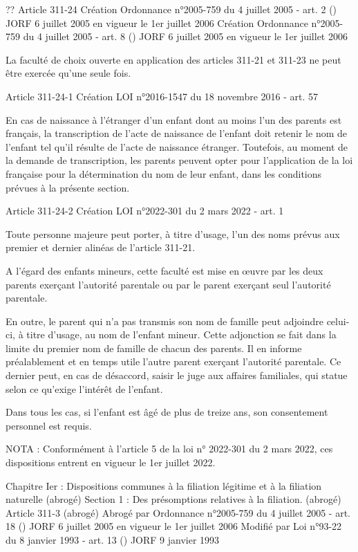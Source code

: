 \documentclass[
  12pt,
]{book}
\begin{document}
\begin{encadre}{??}
Article 311-24
Création Ordonnance n°2005-759 du 4 juillet 2005 - art. 2 () JORF 6 juillet 2005 en vigueur le 1er juillet 2006
Création Ordonnance n°2005-759 du 4 juillet 2005 - art. 8 () JORF 6 juillet 2005 en vigueur le 1er juillet 2006

La faculté de choix ouverte en application des articles 311-21 et 311-23 ne peut être exercée qu'une seule fois.

Article 311-24-1
Création LOI n°2016-1547 du 18 novembre 2016 - art. 57

En cas de naissance à l'étranger d'un enfant dont au moins l'un des parents est français, la transcription de l'acte de naissance de l'enfant doit retenir le nom de l'enfant tel qu'il résulte de l'acte de naissance étranger. Toutefois, au moment de la demande de transcription, les parents peuvent opter pour l'application de la loi française pour la détermination du nom de leur enfant, dans les conditions prévues à la présente section.

Article 311-24-2
Création LOI n°2022-301 du 2 mars 2022 - art. 1

Toute personne majeure peut porter, à titre d'usage, l'un des noms prévus aux premier et dernier alinéas de l'article 311-21.

A l'égard des enfants mineurs, cette faculté est mise en œuvre par les deux parents exerçant l'autorité parentale ou par le parent exerçant seul l'autorité parentale.

En outre, le parent qui n'a pas transmis son nom de famille peut adjoindre celui-ci, à titre d'usage, au nom de l'enfant mineur. Cette adjonction se fait dans la limite du premier nom de famille de chacun des parents. Il en informe préalablement et en temps utile l'autre parent exerçant l'autorité parentale. Ce dernier peut, en cas de désaccord, saisir le juge aux affaires familiales, qui statue selon ce qu'exige l'intérêt de l'enfant.

Dans tous les cas, si l'enfant est âgé de plus de treize ans, son consentement personnel est requis.

NOTA :
Conformément à l'article 5 de la loi n° 2022-301 du 2 mars 2022, ces dispositions entrent en vigueur le 1er juillet 2022.

Chapitre Ier : Dispositions communes à la filiation légitime et à la filiation naturelle (abrogé)
Section 1 : Des présomptions relatives à la filiation. (abrogé)
Article 311-3 (abrogé)
Abrogé par Ordonnance n°2005-759 du 4 juillet 2005 - art. 18 () JORF 6 juillet 2005 en vigueur le 1er juillet 2006
Modifié par Loi n°93-22 du 8 janvier 1993 - art. 13 () JORF 9 janvier 1993


\end{encadre}
\end{document}
